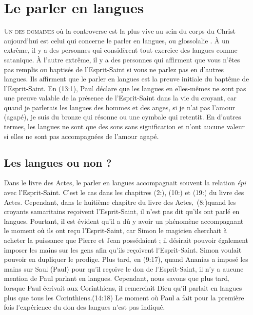 \chapter{Le parler en langues}

\lettrine{U}{n des domaines} où la controverse est la plus vive au sein
 du corps du Christ aujourd'hui est celui qui concerne le parler en
 langues, ou \Og glossolalie \Fg{}.
 À un extrême, il y a des personnes qui considèrent tout exercice
 des langues comme satanique.
 À l'autre extrême, il y a des personnes qui affirment que vous n'êtes pas
 remplis ou baptisés de l'Esprit-Saint si vous ne parlez pas
 en d'autres langues. Ils affirment que le parler en langues
 est la preuve initiale du baptême de l'Esprit-Saint.
 En (13:1), Paul déclare que les langues en elles-mêmes
 ne sont pas une preuve valable de la présence de l'Esprit-Saint dans la vie
 du croyant, car \Og quand je parlerais les langues des hommes et des anges,
 si je n'ai pas l'amour (agapé), je suis du bronze qui résonne ou une cymbale
 qui retentit. \Fg{}
 En d'autres termes, les langues ne sont que des sons sans signification
 et n'ont aucune valeur si elles ne sont pas accompagnées de l'amour agapé.


\section{Les langues ou non ?}

Dans le livre des Actes, le parler en langues accompagnait souvent
 la relation \emph{épi} avec l'Esprit-Saint.
 C'est le cas dans les chapitres (2:), (10:)
 et (19:) du livre des Actes. Cependant, dans le huitième chapitre
 du livre des Actes,~(8:)quand les croyants samaritains reçoivent
 l'Esprit-Saint, il n'est pas dit qu'ils ont parlé en langues.
 Pourtant, il est évident qu'il a dû y avoir un phénomène accompagnant
 le moment où ils ont reçu l'Esprit-Saint, car Simon le magicien cherchait
 à acheter la puissance que Pierre et Jean possédaient ;
 il désirait pouvoir également imposer les mains sur les gens
 afin qu'ils reçoivent l'Esprit-Saint.
 Simon voulait pouvoir en dupliquer le prodige.
 Plus tard, en (9:17), quand Ananias a imposé les mains
 sur Saul (Paul) pour qu'il reçoive le don de l'Esprit-Saint,
 il n'y a aucune mention de Paul parlant en langues.
 Cependant, nous savons que plus tard, lorsque Paul écrivait aux
 Corinthiens, il remerciait Dieu qu'il parlait en langues plus que tous
 les Corinthiens.(14:18)
 Le moment où Paul a fait pour la première fois
 l'expérience  du don
 des langues  n'est pas indiqué.

